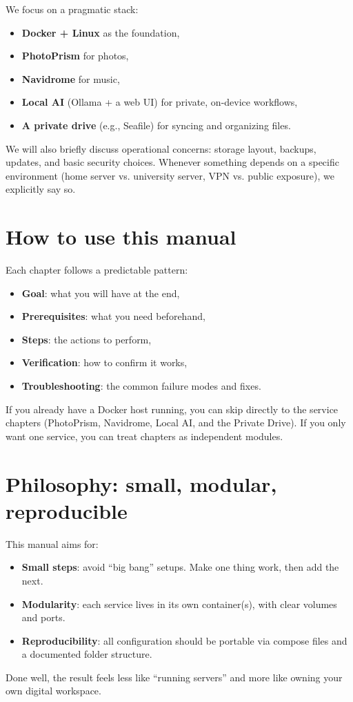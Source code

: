 We focus on a pragmatic stack:
\begin{itemize}[leftmargin=*]
  \item \textbf{Docker + Linux} as the foundation,
  \item \textbf{PhotoPrism} for photos,
  \item \textbf{Navidrome} for music,
  \item \textbf{Local AI} (Ollama + a web UI) for private, on-device workflows,
  \item \textbf{A private drive} (e.g., Seafile) for syncing and organizing files.
\end{itemize}

We will also briefly discuss operational concerns: storage layout, backups, updates, and basic security choices. Whenever something depends on a specific environment (home server vs. university server, VPN vs. public exposure), we explicitly say so.

\section*{How to use this manual}

Each chapter follows a predictable pattern:
\begin{itemize}[leftmargin=*]
  \item \textbf{Goal}: what you will have at the end,
  \item \textbf{Prerequisites}: what you need beforehand,
  \item \textbf{Steps}: the actions to perform,
  \item \textbf{Verification}: how to confirm it works,
  \item \textbf{Troubleshooting}: the common failure modes and fixes.
\end{itemize}

If you already have a Docker host running, you can skip directly to the service chapters (PhotoPrism, Navidrome, Local AI, and the Private Drive). If you only want one service, you can treat chapters as independent modules.

\section*{Philosophy: small, modular, reproducible}

This manual aims for:
\begin{itemize}[leftmargin=*]
  \item \textbf{Small steps}: avoid ``big bang'' setups. Make one thing work, then add the next.
  \item \textbf{Modularity}: each service lives in its own container(s), with clear volumes and ports.
  \item \textbf{Reproducibility}: all configuration should be portable via compose files and a documented folder structure.
\end{itemize}

Done well, the result feels less like ``running servers'' and more like owning your own digital workspace.
